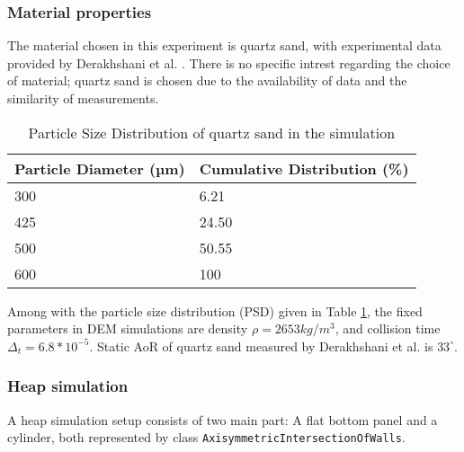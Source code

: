 \subsubsection{Material properties} \label{section:MatProp}
The material chosen in this experiment is quartz sand, with experimental data provided by Derakhshani et al. \cite{DERAKHSHANI2015127}. There is no specific intrest regarding the choice of material; quartz sand is chosen due to the availability of data and the similarity of measurements. 

\begin{table}[H]
    \centering
    \caption{Particle Size Distribution of quartz sand in the simulation}\label{table:PSDQuartzSand}
    \begin{tabular}{l|l}
        Particle Diameter (µm) & Cumulative Distribution (\%) \\ \hline
        300                    & 6.21                         \\
        425                    & 24.50                          \\
        500                    & 50.55                        \\
        600                    & 100                         
    \end{tabular}
\end{table}

Among with the particle size distribution (PSD) given in Table \ref{table:PSDQuartzSand}, the fixed parameters in DEM simulations are density $\rho = 2653 kg/m^3$, and collision time $\Delta_t = 6.8 * 10^{-5}$. Static AoR of quartz sand measured by Derakhshani et al. is $33^{\circ}$.


\subsubsection{Heap simulation}



A heap simulation setup consists of two main part: A flat bottom panel and a cylinder, both represented by class \texttt{AxisymmetricIntersectionOfWalls}. 
